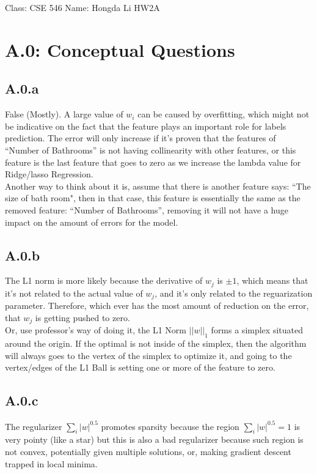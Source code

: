 \documentclass[]{article}
\begin{document}
\begin{center}
    Class: CSE 546 \quad Name: Hongda Li \quad HW2A
\end{center}

\section*{A.0: Conceptual Questions}
    \subsection*{A.0.a}    
        False (Mostly). A large value of $w_i$ can be caused by overfitting, which might not be indicative on the fact that the feature plays an important role for labels prediction. The error will only increase if it's proven that the features of ``Number of Bathrooms'' is not having collinearity with other features, or this feature is the last feature that goes to zero as we increase the lambda value for Ridge/lasso Regression. 
        \\
        Another way to think about it is, assume that there is another feature says: ``The size of bath room", then in that case, this feature is essentially the same as the removed feature: ``Number of Bathrooms'', removing it will not have a huge impact on the amount of errors for the model. 
    \subsection*{A.0.b}
        The L1 norm is more likely because the derivative of $w_j$ is $\pm 1$, which means that it's not related to the actual value of $w_j$, and it's only related to the reguarization parameter. Therefore, which ever has the most amount of reduction on the error, that $w_j$ is getting pushed to zero. 
        \\
        Or, use professor's way of doing it, the L1 Norm $||w||_1$ forms a simplex situated around the origin. If the optimal is not inside of the simplex, then the algorithm will always goes to the vertex of the simplex to optimize it, and going to the vertex/edges of the L1 Ball is setting one or more of the feature to zero. 
    \subsection*{A.0.c}
        The regularizer $\sum_{i}|w|^{0.5}$ promotes sparsity because the region $\sum_{i}|w|^{0.5} = 1$ is very pointy (like a star) but this is also a bad regularizer because such region is not convex, potentially given multiple solutions, or, making gradient descent trapped in local minima. 
\end{document}
